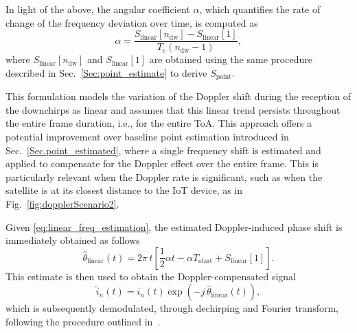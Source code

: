 \documentclass{IEEEtran}
\begin{document}
In light of the above, the angular coefficient $\alpha$, which quantifies the rate of change of the frequency deviation over time, is computed as
\begin{equation}
    \alpha = \frac{S_{\text{linear}}[n_{\text{dw}}] - S_{\text{linear}}[1]}{T_\text{c} (n_{\mathrm{dw}} - 1)},
\end{equation}
where $S_{\text{linear}}[n_{\text{dw}}]$ and $S_{\text{linear}}[1]$ are obtained using the same procedure described in Sec.~\ref{Sec:point_estimate} to derive $S_{\text{point}}$.

This formulation models the variation of the Doppler shift during the reception of the downchirps as linear and assumes that this linear trend persists throughout the entire frame duration, i.e., for the entire \ac{ToA}. This approach offers a potential improvement over baseline point estimation introduced in Sec.~\ref{Sec.point_estimated}, where a single frequency shift is estimated and applied to compensate for the Doppler effect over the entire frame. This is particularly relevant when the Doppler rate is significant, such as when the satellite is at its closest distance to the \ac{IoT} device, as in Fig.~\ref{fig:dopplerScenario2}.

Given \eqref{eq:linear_freq_estimation}, the estimated Doppler-induced phase shift is immediately obtained as follows
\begin{equation}
    \hat{\theta}_{\mathrm{linear}}(t) = 2\pi\,t \left[ \frac{1}{2}\alpha t - \alpha T_\text{start} + S_{\text{linear}}[1] \right].
    \label{eq:Theta_linear}
\end{equation}
This estimate is then used to obtain the Doppler-compensated signal
\begin{equation}  
    \hat{i}_n(t) = i_n(t) \exp\left(-j \, \hat{\theta}_{\mathrm{linear}}(t)\right),  
\end{equation} 
which is subsequently demodulated, through dechirping and Fourier transform, following the procedure outlined in~\cite{Pasolini.2022}.
 
\end{document}
